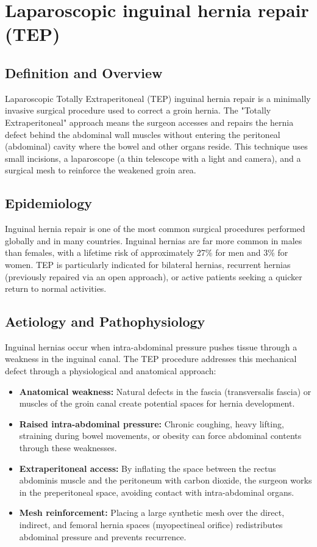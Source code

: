 \chapter{Laparoscopic inguinal hernia repair (TEP)}

\section*{Definition and Overview}
Laparoscopic Totally Extraperitoneal (TEP) inguinal hernia repair is a minimally invasive surgical procedure used to correct a groin hernia. The "Totally Extraperitoneal" approach means the surgeon accesses and repairs the hernia defect behind the abdominal wall muscles without entering the peritoneal (abdominal) cavity where the bowel and other organs reside. This technique uses small incisions, a laparoscope (a thin telescope with a light and camera), and a surgical mesh to reinforce the weakened groin area.

\section*{Epidemiology}
Inguinal hernia repair is one of the most common surgical procedures performed globally and in many countries. Inguinal hernias are far more common in males than females, with a lifetime risk of approximately 27\% for men and 3\% for women. TEP is particularly indicated for bilateral hernias, recurrent hernias (previously repaired via an open approach), or active patients seeking a quicker return to normal activities.

\section*{Aetiology and Pathophysiology}
Inguinal hernias occur when intra-abdominal pressure pushes tissue through a weakness in the inguinal canal. The TEP procedure addresses this mechanical defect through a physiological and anatomical approach:

\begin{itemize}
    \item \textbf{Anatomical weakness:} Natural defects in the fascia (transversalis fascia) or muscles of the groin canal create potential spaces for hernia development.
    \item \textbf{Raised intra-abdominal pressure:} Chronic coughing, heavy lifting, straining during bowel movements, or obesity can force abdominal contents through these weaknesses.
    \item \textbf{Extraperitoneal access:} By inflating the space between the rectus abdominis muscle and the peritoneum with carbon dioxide, the surgeon works in the preperitoneal space, avoiding contact with intra-abdominal organs.
    \item \textbf{Mesh reinforcement:} Placing a large synthetic mesh over the direct, indirect, and femoral hernia spaces (myopectineal orifice) redistributes abdominal pressure and prevents recurrence.
\end{itemize}

